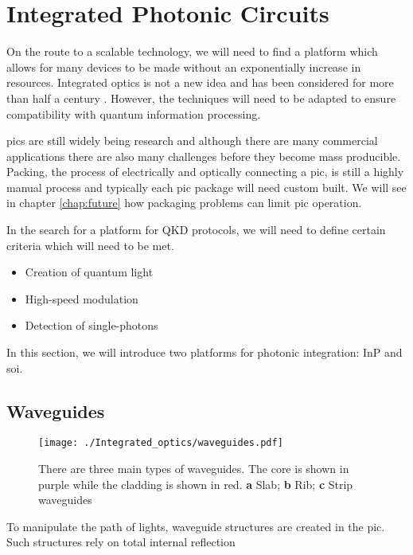 \section{Integrated Photonic Circuits}

On the route to a scalable technology, we will need to find a platform which allows for many devices to be made without an exponentially increase in resources. Integrated optics is not a new idea and has been considered for more than half a century \cite{miller1969}. However, the techniques will need to be adapted to ensure compatibility with quantum information processing.

\Acp{pic} are still widely being research and although there are many commercial applications there are also many challenges before they become mass producible. Packing, the process of electrically and optically connecting a \ac{pic}, is still a highly manual process and typically each \ac{pic} package will need custom built. We will see in chapter \ref{chap:future} how packaging problems can limit \ac{pic} operation.

In the search for a platform for \ac{QKD} protocols, we will need to define certain criteria which will need to be met.

\begin{itemize}
	\item Creation of quantum light
	\item High-speed modulation
	\item Detection of single-photons
\end{itemize}

In this section, we will introduce two platforms for photonic integration: \ac{InP} and \ac{soi}.

\subsection{Waveguides}

\begin{figure}[t]
	\centering
	\texttt{[image: ./Integrated\_optics/waveguides.pdf]}
	\caption[Main types of waveguide structures]{There are three main types of waveguides. The core is shown in purple while the cladding is shown in red. \textbf{a} Slab; \textbf{b} Rib; \textbf{c} Strip waveguides}
	\label{fig:waveguides}
\end{figure}

To manipulate the path of lights, waveguide structures are created in the \ac{pic}. Such structures rely on total internal reflection 

